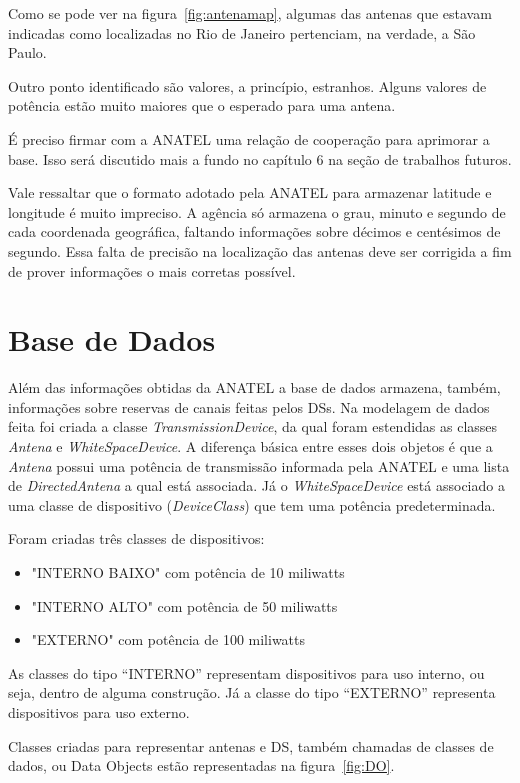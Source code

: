 Como se pode ver na figura~\ref{fig:antenamap}, algumas das antenas que estavam indicadas como localizadas no Rio de Janeiro pertenciam, na verdade, a São Paulo.

Outro ponto identificado são valores, a princípio, estranhos. Alguns valores de potência estão muito maiores que o esperado para uma antena.

É preciso firmar com a ANATEL uma relação de cooperação para aprimorar a base. Isso será discutido mais a fundo no capítulo 6 na seção de trabalhos futuros.

Vale ressaltar que o formato adotado pela ANATEL para armazenar latitude e longitude é muito impreciso. A agência só armazena o grau, minuto e segundo de cada coordenada geográfica, faltando informações sobre décimos e centésimos de segundo. Essa falta de precisão na localização das antenas deve ser corrigida a fim de prover informações o mais corretas possível.

\section{Base de Dados}


Além das informações obtidas da ANATEL a base de dados armazena, também, informações sobre reservas de canais feitas pelos DSs. Na modelagem de dados feita foi criada a classe \textit{TransmissionDevice}, da qual foram estendidas as classes \textit{Antena} e \textit{WhiteSpaceDevice}. A diferença básica entre esses dois objetos é que a \textit{Antena} possui uma potência de transmissão informada pela ANATEL e uma lista de \textit{DirectedAntena} a qual está associada. Já o \textit{WhiteSpaceDevice} está associado a uma classe de dispositivo (\textit{DeviceClass}) que tem uma potência predeterminada.

Foram criadas três classes de dispositivos:

\begin{itemize}
\item "INTERNO BAIXO" com potência de 10 miliwatts
\item "INTERNO ALTO" com potência de 50 miliwatts
\item "EXTERNO" com potência de 100 miliwatts
\end{itemize}

As classes do tipo ``INTERNO'' representam dispositivos para uso interno, ou seja, dentro de alguma construção. Já a classe do tipo ``EXTERNO'' representa dispositivos para uso externo.

Classes criadas para representar antenas e DS, também chamadas de classes de dados, ou Data Objects estão representadas na figura~\ref{fig:DO}.

